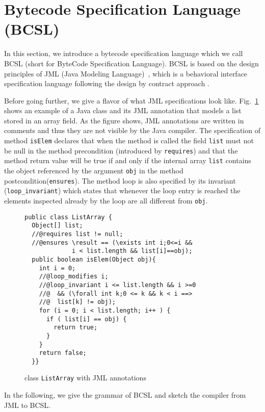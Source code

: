 
\section{Bytecode Specification Language (BCSL)}\label{bcSpecLg}

In this section, we introduce a bytecode specification language which we call BCSL (short for ByteCode Specification Language).
 BCSL is based on the design principles of JML (Java Modeling Language)~\cite{RT03djml,JMLRefMan}, which is a behavioral interface specification 
language following the design by contract approach \cite{M97oos}.


Before going further, we give a flavor of what JML specifications look like. Fig.~\ref{replaceSrc} shows an example of a Java class and its 
JML annotation that models a list stored in an array field. 
As the figure shows, JML annotations are written in comments and thus they are not visible by the Java compiler.
The specification of method \verb!isElem! declares
 that when the method is called the field \verb!list! must not be null in the method precondition (introduced by \verb!requires!) 
and that the method return value will be true if and only if the internal array 
\verb!list! contains the object referenced by the argument \verb!obj! in the method postcondition(\verb!ensures!). The method loop is also specified by
its invariant (\verb!loop_invariant!) which states that whenever the loop entry is reached the elements inspected already by the loop are all different from \verb!obj!.

 
\begin{figure}[!h]
\begin{verbatim}
public class ListArray {
  Object[] list;
  //@requires list != null;
  //@ensures \result == (\exists int i;0<=i && 
             i < list.length && list[i]==obj); 
  public boolean isElem(Object obj){
    int i = 0;
    //@loop_modifies i;
    //@loop_invariant i <= list.length && i >=0 
    //@  && (\forall int k;0 <= k && k < i ==> 
    //@  list[k] != obj); 
    for (i = 0; i < list.length; i++ ) {
      if ( list[i] == obj) {
        return true;	
      }
    }
    return false;
  }}
\end{verbatim}
\caption{\sc class \texttt{ListArray} with JML annotations} 
\label{replaceSrc}
\end{figure}

In the following, we give the grammar of BCSL and sketch the compiler from JML to BCSL. 

